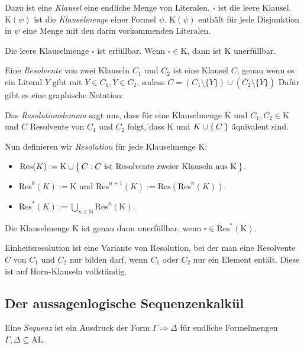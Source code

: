 \documentclass[a4paper,parskip=half*,DIV=15,fontsize=11pt]{scrartcl}
\newcommand{\AL}{\mathrm{AL}}
\newcommand{\Kl}{\mathrm{K}}
\newcommand{\Res}{\mathrm{Res}}
\begin{document}
Dazu ist eine \emph{Klausel} eine endliche Menge von Literalen. $\square$ ist die leere Klausel. $\Kl(\psi)$ ist die \emph{Klauselmenge} einer Formel $\psi$. $\Kl(\psi)$ enthält für jede Disjunktion in $\psi$ eine Menge mit den darin vorkommenden Literalen.

Die leere Klauselmenge $\square$ ist erfüllbar. Wenn $\square \in \Kl$, dann ist $\Kl$ unerfüllbar.

Eine \emph{Resolvente} von zwei Klauseln $C_1$ und $C_2$ ist eine Klausel $C$, genau wenn es ein Literal $Y$ gibt mit $Y \in C_1, \overline{Y} \in C_2$, sodass $C = (C_1 \setminus \{Y\}) \cup (C_2 \setminus \{\overline{Y}\})$ Dafür gibt es eine graphische Notation:\\
\begin{center}
\end{center}

Das \emph{Resolutionslemma} sagt uns, dass für eine Klauselmenge $\Kl$ und $C_1, C_2 \in \Kl$ und $C$ Resolvente von $C_1$ und $C_2$ folgt, dass $\Kl$ und $K \cup \Set{C}$ äquivalent sind.

Nun definieren wir \emph{Resolution} für jede Klauselmenge $\Kl$:
\begin{itemize}
\item $\Res(K) := \Kl \cup \Set{C : C \textrm{ ist Resolvente zweier Klauseln aus } \Kl}$.
\item $\Res^0(K) := \Kl$ und $\Res^{n+1}(K) := \Res(\Res^n(K))$.
\item $\Res^\ast(K) := \bigcup_{n \in \mathbb{N}} \Res^n(\Kl)$.
\end{itemize}

Die Klauselmenge $\Kl$ ist genau dann unerfüllbar, wenn $\square \in \Res^\ast(\Kl)$.

Einheitsresolution ist eine Variante von Resolution, bei der man eine Resolvente $C$ von $C_1$ und $C_2$ nur bilden darf, wenn $C_1$ oder $C_2$ nur ein Element entält. Diese ist auf Horn-Klauseln vollständig.

\subsection{Der aussagenlogische Sequenzenkalkül}

Eine \emph{Sequenz} ist ein Ausdruck der Form $\Gamma \Rightarrow \Delta$ für endliche Formelmengen $\Gamma, \Delta \subseteq \AL$.
\end{document}
